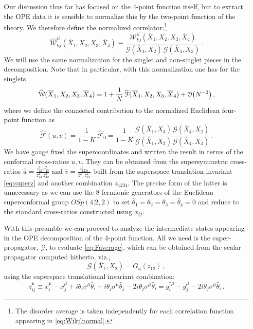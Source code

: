 \documentclass[11pt]{article}
\newcommand{\thetab}{\bar{\theta}}
\newcommand{\Xb}{\overline{X}}
\begin{document}
Our discussion thus far has focused on the 4-point function itself, but to extract the OPE data it is sensible to normalize this by the two-point function of the theory. We therefore define the normalized correlator:\footnote{ The disorder average is taken independently for each correlation function appearing  in \eqref{eq:Wikjlnormal}.}
%
\begin{equation}\label{eq:Wikjlnormal}
\widehat{\mathcal{W}}^{il}_{kj} (\Xb_{1},X_{2},X_{3},\Xb_{4})  
\equiv \frac{\mathcal{W}^{il}_{kj} (\Xb_{1},X_{2},X_{3},\Xb_{4}) }{\mathscr{G}(\Xb_1,X_2)\, \mathscr{G}(\Xb_4,X_3)} \,. 
\end{equation}  
%
We will use the same normalization for the singlet and non-singlet pieces in the decomposition. Note that in particular, with this normalization one has for the singlets 
%
\begin{equation}\label{eq:4ptfn}
\begin{split}
\widehat{\mathcal{W}}(\Xb_{1},X_{2},X_{3},\Xb_{4}) 
= 
  1+  \frac{1}{N}\, \widehat{\mathcal{F}}(\Xb_1, X_2,X_3,\Xb_4)  + \order{N^{-2}} \,,
\end{split}
\end{equation}  
%
where we define the connected contribution to the normalized Euclidean four-point function as
%
\begin{equation}\label{eq:Faverage}
\widehat{\mathcal{F}} (u,v)
=   \frac{1}{1-K}\, \widehat{\mathcal{F}}_0 = 
  \frac{1}{1-K}\, \frac{\mathscr{G}(\Xb_1,X_3)\, \mathscr{G}(\Xb_4,X_2)}{\mathscr{G}(\Xb_1,X_2)\, \mathscr{G}(\Xb_4,X_3)} \,.
\end{equation}  
%
We have gauge fixed the supercoordinates and written the result in terms of the conformal cross-ratios 
$u,v$. They  can be obtained from the supersymmetric cross-ratios 
$\hat{u} = \frac{z_{12}^2\, z_{43}^2}{z_{13}^2\, z_{42}^2}$ and $\hat{v}= \frac{z_{1234}^2}{z_{13}^2\, z_{42}^2}$ built from the superspace translation invariant \eqref{eq:superz} and another combination $z_{1234}$. The precise form of the latter is  unnecessary as we can use the 8 fermionic generators of the Euclidean superconformal group $OSp(4|2,2)$ to set $\thetab_1= \theta_2 = \theta_3=\thetab_4=0$ and reduce to the standard cross-ratios constructed using $x_{ij}$.  


With this preamble we can proceed to analyze the intermediate states appearing in the OPE decomposition of the 4-point function. All we need is the super-propagator, $\mathscr{G}$,  to evaluate \eqref{eq:Faverage}, which can be obtained from the scalar propagator computed hitherto, viz., 
%
\begin{equation}\label{eq:Gsuper}
\mathscr{G}(\Xb_1,X_2) = G_\phi(z_{12}) \,,
\end{equation}  
%
using the superspace translational invariant combination: 
%
\begin{equation}\label{eq:superz}
z_{ij}^\mu  \equiv x_i^\mu-x_j^\mu+i \theta_i \sigma^\mu\thetab_i +i \theta_j \sigma^\mu\thetab_j-2 i \theta_j \sigma^\mu \thetab_i 
= y^{\dagger\mu}_i - y^\mu_j - 2 i \theta_j \sigma^\mu \thetab_i \,.
\end{equation}  
%
\end{document}
